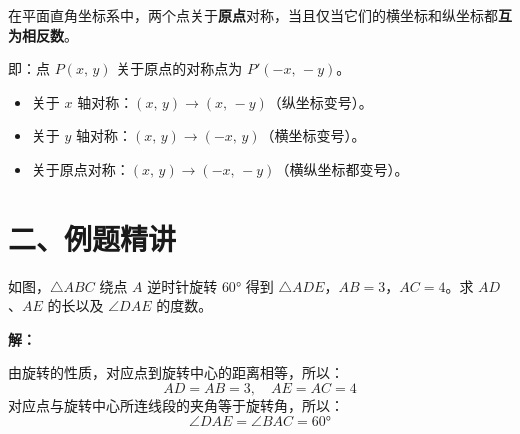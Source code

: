 \documentclass[12pt, a4paper]{ctexart}
\begin{document}
\begin{knowledgebox}[关于原点对称的坐标关系]
在平面直角坐标系中，两个点关于\textbf{原点}对称，当且仅当它们的横坐标和纵坐标都\textbf{互为相反数}。

即：点 $P(x,\, y)$ 关于原点的对称点为 $P'(-x,\, -y)$。
\end{knowledgebox}

\begin{center}
\end{center}

\begin{tipbox}[坐标系中对称的总结]
\begin{itemize}[nosep]
  \item 关于 $x$ 轴对称：$(x,\, y) \to (x,\, -y)$（纵坐标变号）。
  \item 关于 $y$ 轴对称：$(x,\, y) \to (-x,\, y)$（横坐标变号）。
  \item 关于原点对称：$(x,\, y) \to (-x,\, -y)$（横纵坐标都变号）。
\end{itemize}
\end{tipbox}

\section*{\textcolor{examorange}{二、例题精讲}}

\begin{examplebox}[【例题1】旋转性质的基本应用]
如图，$\triangle ABC$ 绕点 $A$ 逆时针旋转 $60°$ 得到 $\triangle ADE$，$AB = 3$，$AC = 4$。求 $AD$、$AE$ 的长以及 $\angle DAE$ 的度数。
\end{examplebox}

\textbf{解：}

由旋转的性质，对应点到旋转中心的距离相等，所以：
\[
AD = AB = 3, \quad AE = AC = 4
\]
对应点与旋转中心所连线段的夹角等于旋转角，所以：
\[
\angle DAE = \angle BAC = 60°
\]
\end{document}

